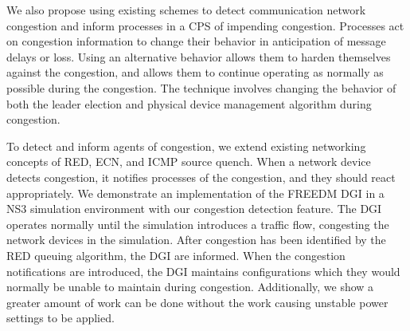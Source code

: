 We also propose using existing schemes to detect communication network congestion and inform processes in a \ac{CPS} of impending congestion.
Processes act on congestion information to change their behavior in anticipation of message delays or loss.
Using an alternative behavior allows them to harden themselves against the congestion, and allows them to continue operating as normally as possible during the congestion.
The technique involves changing the behavior of both the leader election\cite{INVITATIONELECTION} and physical device management algorithm during congestion.

To detect and inform agents of congestion, we extend existing networking concepts of \ac{RED}, \ac{ECN}\cite{RFCECN}, and ICMP source quench\cite{RFCSOURCEQUENCH}.
When a network device detects congestion, it notifies processes of the congestion, and they should react appropriately.
We demonstrate an implementation of the \ac{FREEDM} \ac{DGI} in a \ac{NS3} simulation environment\cite{NS3} with our congestion detection feature.
The \ac{DGI} operates normally until the simulation introduces a traffic flow, congesting the network devices in the simulation.
After congestion has been identified by the \ac{RED} queuing algorithm, the \ac{DGI} are informed. %
When the congestion notifications are introduced, the \ac{DGI} maintains configurations which they would normally be unable to maintain during congestion.
Additionally, we show a greater amount of work can be done without the work causing unstable power settings to be applied.

